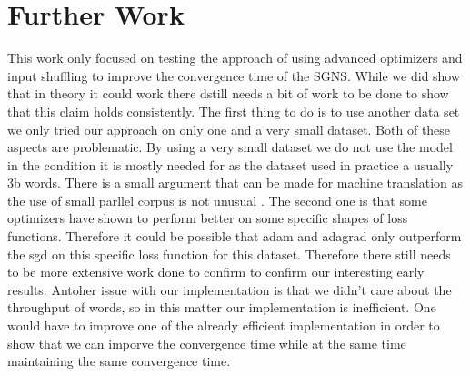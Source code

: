 \section{Further Work}
This work only focused on testing the approach of using advanced optimizers and input shuffling to improve the convergence time of the SGNS. While we did show that in theory it could work there dstill needs a bit of work to be done to show that this claim holds consistently. The first thing to do is to use another data set we only tried our approach on only one and a very small dataset. Both of these aspects are problematic. By using a very small dataset we do not use the model in the condition it is mostly needed for as the dataset used in practice a usually 3b words. There is a small argument that can be made for machine translation as the use of small parllel corpus is not unusual . The second one is that some optimizers have shown to perform better on some specific shapes of loss functions. Therefore it could be possible that adam and adagrad only outperform the sgd on this specific loss function for this dataset. Therefore there still needs to be more extensive work done to confirm to confirm our interesting early results. Antoher issue with our implementation is that we didn't care about the throughput of words, so in this matter our implementation is inefficient. One would have to improve one of the already efficient implementation in order to show that we can imporve the convergence time while at the same time maintaining the same convergence time.



